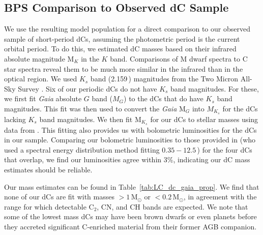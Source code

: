 \documentclass[twocolumn]{aastex631}
\begin{document}

\subsection{BPS Comparison to Observed dC Sample}\label{subsec:dc_bps_compare}

We use the resulting model population for a direct comparison to our observed sample of short-period dCs, assuming the photometric period is the current orbital period. To do this, we estimated dC masses based on their infrared absolute magnitude M$_K$ in the $K$ band. Comparisons of M dwarf spectra \citep{Ivanov2004} to C star spectra  \citep{Tanaka2007} reveal them to be much more similar in the infrared than in the optical region. We used $K_s$ band (2.159\,\micron) magnitudes from the  Two Micron All-Sky Survey \citep[2MASS;][]{2MASS}. Six of our periodic dCs do not have $K_s$ band magnitudes. For these, we first fit {\em Gaia} absolute $G$ band ($M_G$) to the dCs that do have $K_s$ band magnitudes. This fit was then used to convert the {\em Gaia} M$_G$ into $M_{K_s}$ for the dCs lacking $K_s$ band magnitudes. We then fit M$_{K_s}$ for our dCs to stellar masses using data from \citet{Kraus2007}. This fitting also provides us with bolometric luminosities for the dCs in our sample. Comparing our bolometric luminosities to those provided in \citet{Green2019} (who used a spectral energy distribution method fitting $0.35-12.5$\,\micron) for the four dCs that overlap, we find our luminosities agree within 3\%, indicating our dC mass estimates should be reliable.

Our mass estimates can be found in Table~\ref{tab:LC_dc_gaia_prop}. We find that none of our dCs are fit with masses $> 1$\,M$_\odot$ or $< 0.2$\,M$_\odot$, in agreement with the range for which detectable C$_2$, CN, and CH bands are expected. We note that some of the lowest mass dCs may have been brown dwarfs or even planets before they accreted significant C-enriched material from their former AGB companion. 
\end{document}
